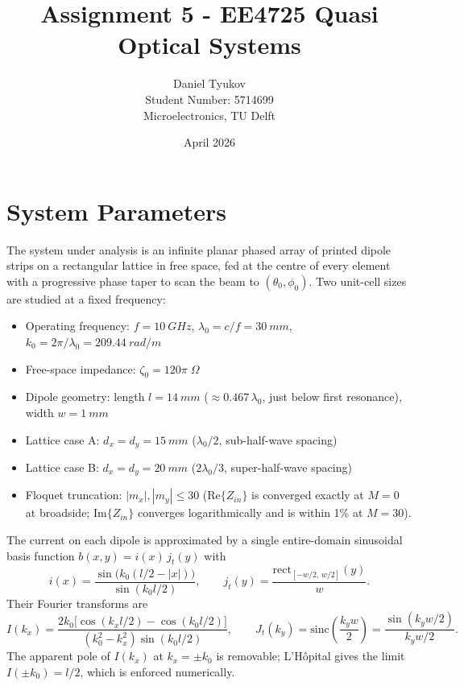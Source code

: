 \documentclass{article}
\title{Assignment 5 - EE4725 Quasi Optical Systems}
\author{Daniel Tyukov \\ Student Number: 5714699 \\ Microelectronics, TU Delft}
\date{April 2026}
\begin{document}
\maketitle

\tableofcontents
\newpage

\section{System Parameters}

The system under analysis is an infinite planar phased array of printed dipole strips on a rectangular lattice in free space, fed at the centre of every element with a progressive phase taper to scan the beam to $(\theta_0,\phi_0)$. Two unit-cell sizes are studied at a fixed frequency:

\begin{itemize}
\item Operating frequency: $f = \SI{10}{GHz}$, $\lambda_0 = c/f = \SI{30}{mm}$, $k_0 = 2\pi/\lambda_0 = \SI{209.44}{rad/m}$
\item Free-space impedance: $\zeta_0 = 120\pi\;\Omega$
\item Dipole geometry: length $l = \SI{14}{mm}$ ($\approx 0.467\,\lambda_0$, just below first resonance), width $w = \SI{1}{mm}$
\item Lattice case A: $d_x = d_y = \SI{15}{mm}$ ($\lambda_0/2$, sub-half-wave spacing)
\item Lattice case B: $d_x = d_y = \SI{20}{mm}$ ($2\lambda_0/3$, super-half-wave spacing)
\item Floquet truncation: $|m_x|, |m_y| \leq 30$ (Re$\{Z_{in}\}$ is converged exactly at $M=0$ at broadside; Im$\{Z_{in}\}$ converges logarithmically and is within 1\% at $M=30$).
\end{itemize}

The current on each dipole is approximated by a single entire-domain sinusoidal basis function $b(x,y) = i(x)\,j_t(y)$ with
\begin{equation}\label{eq:basis}
i(x) = \frac{\sin\!\big(k_0(l/2 - |x|)\big)}{\sin(k_0 l/2)},\qquad
j_t(y) = \frac{\mathrm{rect}_{[-w/2,\,w/2]}(y)}{w}.
\end{equation}
Their Fourier transforms are
\begin{equation}\label{eq:basis_FT}
I(k_x) = \frac{2k_0\big[\cos(k_x l/2) - \cos(k_0 l/2)\big]}{(k_0^2 - k_x^2)\sin(k_0 l/2)},
\qquad
J_t(k_y) = \mathrm{sinc}\!\left(\frac{k_y w}{2}\right) = \frac{\sin(k_y w/2)}{k_y w/2}.
\end{equation}
The apparent pole of $I(k_x)$ at $k_x = \pm k_0$ is removable; L'H\^opital gives the limit $I(\pm k_0) = l/2$, which is enforced numerically.
\end{document}
